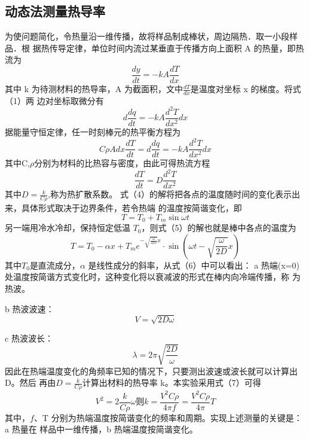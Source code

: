 \documentclass[11pt,a4paper]{article}
\begin{document}
\subsection{动态法测量热导率}
为使问题简化，令热量沿一维传播，故将样品制成棒状，周边隔热．取一小段样品．根
据热传导定律，单位时间内流过某垂直于传播方向上面积 A 的热量，即热流为
\begin{equation}
    \frac{dy}{d t}  =  - kA\frac{dT}{d x} 
\end{equation}
其中 k 为待测材料的热导率，A 为截面积，文中$\frac{dT}{dx}$是温度对坐标 x 的梯度。将式（1）两
边对坐标取微分有
\begin{equation}
    d\frac{dq}{dt}=-kA\frac{d^2 T}{d x^2}dx  
\end{equation}
据能量守恒定律，任一时刻棒元的热平衡方程为
\begin{equation}
    C\rho Adx\frac{dT}{dt}=d\frac{dq}{dt}=-kA\frac{d^2 T}{d x^2}dx  
\end{equation}
其中C,$\rho$分别为材料的比热容与密度，由此可得热流方程
\begin{equation}
    \frac{dT}{dt} =D\frac{d^2 T}{d x^2} 
\end{equation}
其中$D=\frac{k}{C\rho }$,称为热扩散系数。
式（4）的解将把各点的温度随时间的变化表示出来，具体形式取决于边界条件，若令热端
的温度按简谐变化，即
\begin{equation}
    T=T_0+T_m\sin \omega t
\end{equation}
另一端用冷水冷却，保持恒定低温 $T_0$，则式（5）的解也就是棒中各点的温度为
\begin{equation}
    T = {T_0} - \alpha x + {T_m}{e^{ - \sqrt {\frac{\omega }{{2D}}} x}} \cdot \sin \left( {\omega t - \sqrt {\frac{\omega }{{2D}}} x} \right)
\end{equation}
其中$T_0$是直流成分，$\alpha$ 是线性成分的斜率，从式（6）中可以看出：
a 热端(x=0)处温度按简谐方式变化时，这种变化将以衰减波的形式在棒内向冷端传播，称
为热波。

b 热波波速：
\begin{equation}
    V=\sqrt{2D\omega }  
\end{equation}


c 热波波长：
\begin{equation}
    \lambda =2\pi \sqrt{\frac{2D}{\omega } } 
\end{equation}
因此在热端温度变化的角频率已知的情况下，只要测出波速或波长就可以计算出D。然后
再由$D=\frac{k}{C\rho } $计算出材料的热导率 k。本实验采用式（7）可得
\begin{equation}
    V^2=2\frac{k}{C\rho } \omega   则k=\frac{V^2C\rho }{4\pi f} =\frac{V^2C\rho }{4\pi } T
\end{equation}
其中，$f$、T 分别为热端温度按简谐变化的频率和周期。实现上述测量的关键是：a 热量在
样品中一维传播，b 热端温度按简谐变化。
\end{document}
